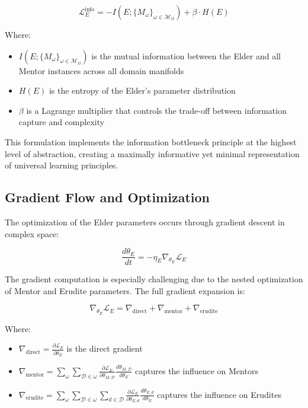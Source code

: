 \begin{equation}
\mathcal{L}_E^{\text{info}} = -I(E; \{M_{\omega}\}_{\omega \in \mathcal{M}_{\Omega}}) + \beta \cdot H(E)
\end{equation}

Where:
\begin{itemize}
\item $I(E; \{M_{\omega}\}_{\omega \in \mathcal{M}_{\Omega}})$ is the mutual information between the Elder and all Mentor instances across all domain manifolds
\item $H(E)$ is the entropy of the Elder's parameter distribution
\item $\beta$ is a Lagrange multiplier that controls the trade-off between information capture and complexity
\end{itemize}

This formulation implements the information bottleneck principle at the highest level of abstraction, creating a maximally informative yet minimal representation of universal learning principles.

\subsection{Gradient Flow and Optimization}

The optimization of the Elder parameters occurs through gradient descent in complex space:

\begin{equation}
\frac{d\theta_E}{dt} = -\eta_E \nabla_{\theta_E} \mathcal{L}_E
\end{equation}

The gradient computation is especially challenging due to the nested optimization of Mentor and Erudite parameters. The full gradient expansion is:

\begin{equation}
\nabla_{\theta_E} \mathcal{L}_E = \nabla_{\text{direct}} + \nabla_{\text{mentor}} + \nabla_{\text{erudite}}
\end{equation}

Where:
\begin{itemize}
\item $\nabla_{\text{direct}} = \frac{\partial \mathcal{L}_E}{\partial \theta_E}$ is the direct gradient
\item $\nabla_{\text{mentor}} = \sum_{\omega} \sum_{\mathcal{D} \in \omega} \frac{\partial \mathcal{L}_E}{\partial \theta_{M,\mathcal{D}}} \frac{d\theta_{M,\mathcal{D}}}{d\theta_E}$ captures the influence on Mentors
\item $\nabla_{\text{erudite}} = \sum_{\omega} \sum_{\mathcal{D} \in \omega} \sum_{d \in \mathcal{D}} \frac{\partial \mathcal{L}_E}{\partial \theta_{E,d}} \frac{d\theta_{E,d}}{d\theta_E}$ captures the influence on Erudites
\end{itemize}


